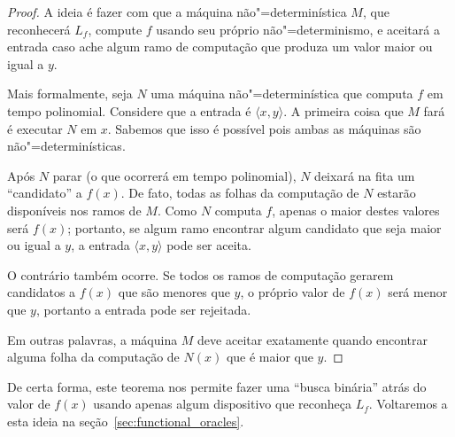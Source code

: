 \begin{proof}
    A ideia é fazer com que a máquina não"=determinística $M$,
    que reconhecerá $L_f$,
    compute $f$ usando seu próprio não"=determinismo,
    e aceitará a entrada caso ache algum ramo de computação
    que produza um valor maior ou igual a $y$.

    Mais formalmente,
    seja $N$ uma máquina não"=determinística que computa $f$ em tempo polinomial.
    Considere que a entrada é $\langle x, y \rangle$.
    A primeira coisa que $M$ fará é executar $N$ em $x$.
    Sabemos que isso é possível pois ambas as máquinas são não"=determinísticas.

    Após $N$ parar
    (o que ocorrerá em tempo polinomial),
    $N$ deixará na fita um ``candidato'' a $f(x)$.
    De fato,
    todas as folhas da computação de $N$ estarão disponíveis nos ramos de $M$.
    Como $N$ computa $f$,
    apenas o maior destes valores será $f(x)$;
    portanto,
    se algum ramo encontrar algum candidato que seja maior ou igual a $y$,
    a entrada $\langle x, y \rangle$ pode ser aceita.

    O contrário também ocorre.
    Se todos os ramos de computação gerarem candidatos a $f(x)$
    que são menores que $y$,
    o próprio valor de $f(x)$ será menor que $y$,
    portanto a entrada pode ser rejeitada.

    Em outras palavras,
    a máquina $M$ deve aceitar exatamente quando encontrar
    alguma folha da computação de $N(x)$ que é maior que $y$.
\end{proof}

De certa forma,
este teorema nos permite fazer uma ``busca binária''
atrás do valor de $f(x)$
usando apenas algum dispositivo que reconheça $L_f$.
Voltaremos a esta ideia na seção~\ref{sec:functional_oracles}.
